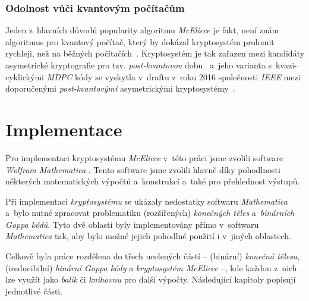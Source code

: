 \documentclass[thesis=M,czech,hidelinks]{FITthesis}[2012/06/26]
\newcommand{\0}{{\textcolor[gray]{0.75}{0}}}
\begin{document}
\clearpage

\subsection{Odolnost vůči kvantovým počítačům}

Jeden z~hlavních důvodů popularity algoritmu \emph{McEliece} je fakt, není znám
algoritmus pro kvantový počítač, který by dokázal kryptosystém prolomit
rychleji, než na běžných počítačích~\cite{Dinh}. Kryptosystém je tak zařazen
mezi kandidáty asymetrické kryptografie pro tzv. \emph{post-kvantovou}
dobu~\cite{Post-Quantum_Cryptography} a~jeho varianta s~kvazi-cyklickými
\emph{MDPC} kódy se vyskytla v~draftu z~roku 2016 společnosti \emph{IEEE} mezi
doporučenými \emph{post-kvantovými} asymetrickými kryptosystémy~\cite{Schanck}.





\chapter{Implementace}\label{kap_implementace}

Pro implementaci kryptosystému \emph{McEliece} v~této práci jsme zvolili software
\emph{Wolfram Mathematica} \cite{Mathematica}. Tento software jsme zvolili hlavně
díky pohodlnosti některých matematických výpočtů a~konstrukcí a~také pro
přehlednost výstupů. %

Při implementaci \emph{kryptosystému} se ukázaly nedostatky softwaru
\emph{Mathematica} a~bylo nutné zpracovat problematiku (rozšířených)
\emph{konečných těles} a~\emph{binárních Goppa kódů}. Tyto dvě oblasti byly
implementovány přímo v~softwaru \emph{Mathematica} tak, aby bylo možné jejich
pohodlné použití i v~jiných oblastech.

Celkově byla práce rozdělena do třech ucelených částí -- (binární) \emph{konečná
tělesa}, (ireducibilní) \emph{binární Goppa kódy} a \emph{kryptosystém McEliece}
--, kde každou z~nich lze využít jako \emph{balík} či \emph{knihovnu} pro další
výpočty. Následující kapitoly popisují jednotlivé části.



\end{document}
